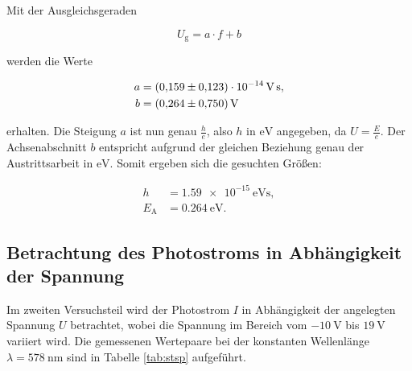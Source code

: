 Mit der Ausgleichsgeraden

\begin{equation*}
U_\text{g} = a\cdot f + b
\end{equation*}

werden die Werte

\begin{align*}
a &= \SI{0.159+-0.123e-14}{\volt\second},\\
b &= \SI{0.264+-0.750}{\volt}
\end{align*}

erhalten.
Die Steigung $a$ ist nun genau $\frac{h}{e}$, also $h$ in $\si{\eV}$ angegeben, da $U = \frac{E}{e}$. Der 
Achsenabschnitt $b$ entspricht aufgrund der gleichen Beziehung genau der Austrittsarbeit in $\si{\eV}$.
Somit ergeben sich die gesuchten Größen: 

\begin{align*}
h &= \SI{1.59e-15}{\eV\second},\\
E_\text{A} &= \SI{0.264}{\eV}.
\end{align*}

\subsection{Betrachtung des Photostroms in Abhängigkeit der Spannung}

Im zweiten Versuchsteil wird der Photostrom $I$ in Abhängigkeit der angelegten Spannung $U$
betrachtet, wobei die Spannung im Bereich vom $\SI{-10}{\volt}$ bis $\SI{19}{\volt}$ variiert 
wird. Die gemessenen Wertepaare bei der konstanten Wellenlänge $\lambda = \SI{578}{\nano\meter}$
sind in Tabelle \ref{tab:stsp} aufgeführt. 

